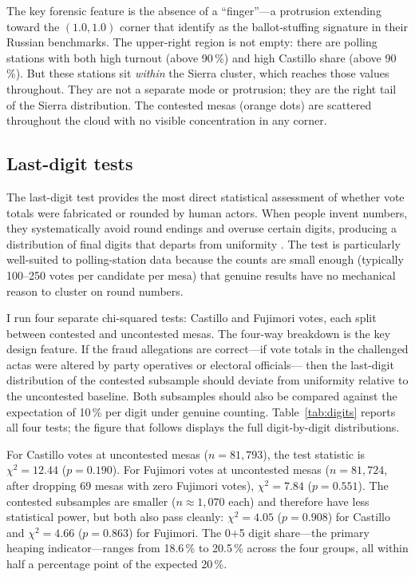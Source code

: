 \documentclass[12pt]{article}
\begin{document}
The key forensic feature is the absence of a ``finger''---a protrusion
extending toward the $(1.0, 1.0)$ corner that \citet{klimek2012} identify as
the ballot-stuffing signature in their Russian benchmarks. The upper-right
region is not empty: there are polling stations with both high turnout
(above 90\,\%) and high Castillo share (above 90\,\%). But these stations
sit \emph{within} the Sierra cluster, which reaches those values throughout.
They are not a separate mode or protrusion; they are the right tail of the
Sierra distribution. The contested mesas (orange dots) are scattered
throughout the cloud with no visible concentration in any corner.

\subsection{Last-digit tests}

The last-digit test provides the most direct statistical assessment of whether
vote totals were fabricated or rounded by human actors. When people invent
numbers, they systematically avoid round endings and overuse certain digits,
producing a distribution of final digits that departs from uniformity
\citep{beber2012}. The test is particularly well-suited to polling-station
data because the counts are small enough (typically 100--250 votes per
candidate per mesa) that genuine results have no mechanical reason to cluster
on round numbers.

I run four separate chi-squared tests: Castillo and Fujimori votes, each
split between contested and uncontested mesas. The four-way breakdown is the
key design feature. If the fraud allegations are correct---if vote totals in
the challenged actas were altered by party operatives or electoral officials---
then the last-digit distribution of the contested subsample should deviate
from uniformity relative to the uncontested baseline. Both subsamples should
also be compared against the expectation of 10\,\% per digit under genuine
counting. Table~\ref{tab:digits} reports all four tests; the figure that
follows displays the full digit-by-digit distributions.

For Castillo votes at uncontested mesas ($n = 81{,}793$), the test statistic
is $\chi^2 = 12.44$ ($p = 0.190$). For Fujimori votes at uncontested mesas
($n = 81{,}724$, after dropping 69 mesas with zero Fujimori votes), $\chi^2 =
7.84$ ($p = 0.551$). The contested subsamples are smaller ($n \approx
1{,}070$ each) and therefore have less statistical power, but both also pass
cleanly: $\chi^2 = 4.05$ ($p = 0.908$) for Castillo and $\chi^2 = 4.66$
($p = 0.863$) for Fujimori. The 0+5 digit share---the primary heaping
indicator---ranges from 18.6\,\% to 20.5\,\% across the four groups, all
within half a percentage point of the expected 20\,\%.
\end{document}
